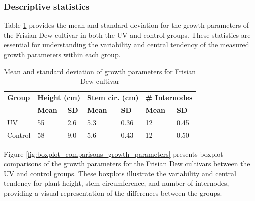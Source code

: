 \subsubsection{Descriptive statistics}

Table \ref{tab:descriptive_statistics} provides the mean and standard deviation for the growth parameters of the Frisian Dew cultivar in both the UV and control groups. These statistics are essential for understanding the variability and central tendency of the measured growth parameters within each group.

\begin{table}[htbp]
    \caption[Mean and standard deviation of growth parameters]{Mean and standard deviation of growth parameters for Frisian Dew cultivar}
    \label{tab:descriptive_statistics}
    \begin{tabularx}{\linewidth}{l|XX|XX|XX}
        \toprule
        \textbf{Group} & \multicolumn{2}{l|}{\textbf{Height (\unit[mode=text]{\cm})}} & \multicolumn{2}{l|}{\textbf{Stem cir. (\unit[mode=text]{\cm})}} & \multicolumn{2}{l}{\textbf{\# Internodes}} \\
        & \textbf{Mean} & \textbf{SD} & \textbf{Mean} & \textbf{SD} & \textbf{Mean} & \textbf{SD} \\
        \midrule
        UV & \num[mode=text]{55} & \num[mode=text]{2.6} & \num[mode=text]{5.3} & \num[mode=text]{0.36} & \num[mode=text]{12} & \num[mode=text]{0.45} \\
        Control & \num[mode=text]{58} & \num[mode=text]{9.0} & \num[mode=text]{5.6} & \num[mode=text]{0.43} & \num[mode=text]{12} & \num[mode=text]{0.50} \\
        \bottomrule
    \end{tabularx}
\end{table}

Figure \ref{fig:boxplot_comparisons_growth_parameters} presents boxplot comparisons of the growth parameters for the Frisian Dew cultivars between the UV and control groups. These boxplots illustrate the variability and central tendency for plant height, stem circumference, and number of internodes, providing a visual representation of the differences between the groups.

